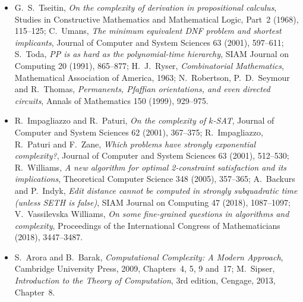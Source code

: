 \begin{itemize}
\item G.~S.~Tseitin, \emph{On the complexity of derivation in propositional calculus}, Studies in Constructive Mathematics and Mathematical Logic, Part~2 (1968), 115--125; C.~Umans, \emph{The minimum equivalent DNF problem and shortest implicants}, Journal of Computer and System Sciences 63 (2001), 597--611; S.~Toda, \emph{PP is as hard as the polynomial-time hierarchy}, SIAM Journal on Computing 20 (1991), 865--877; H.~J.~Ryser, \emph{Combinatorial Mathematics}, Mathematical Association of America, 1963; N.~Robertson, P.~D.~Seymour and R.~Thomas, \emph{Permanents, Pfaffian orientations, and even directed circuits}, Annals of Mathematics 150 (1999), 929--975.
\item R.~Impagliazzo and R.~Paturi, \emph{On the complexity of $k$-SAT}, Journal of Computer and System Sciences 62 (2001), 367--375; R.~Impagliazzo, R.~Paturi and F.~Zane, \emph{Which problems have strongly exponential complexity?}, Journal of Computer and System Sciences 63 (2001), 512--530; R.~Williams, \emph{A new algorithm for optimal 2-constraint satisfaction and its implications}, Theoretical Computer Science 348 (2005), 357--365; A.~Backurs and P.~Indyk, \emph{Edit distance cannot be computed in strongly subquadratic time (unless SETH is false)}, SIAM Journal on Computing 47 (2018), 1087--1097; V.~Vassilevska Williams, \emph{On some fine-grained questions in algorithms and complexity}, Proceedings of the International Congress of Mathematicians (2018), 3447--3487.
\item S.~Arora and B.~Barak, \emph{Computational Complexity: A Modern Approach}, Cambridge University Press, 2009, Chapters~4, 5, 9 and~17; M.~Sipser, \emph{Introduction to the Theory of Computation}, 3rd edition, Cengage, 2013, Chapter~8.
\end{itemize}
